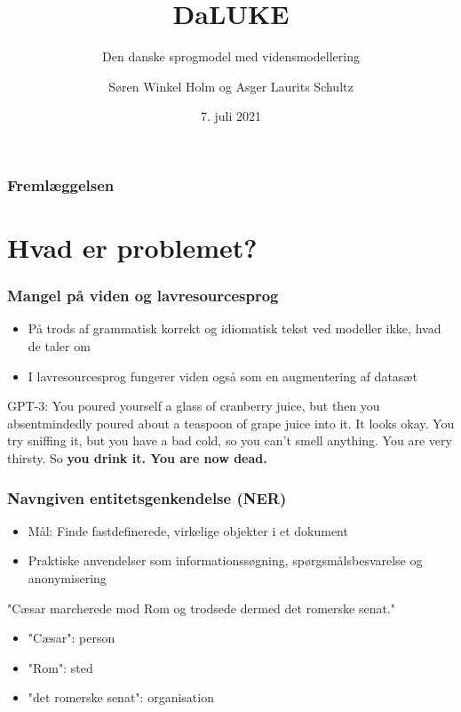 \documentclass{beamer}
\title{DaLUKE}
\subtitle{
    Den danske sprogmodel med vidensmodellering
}
\author[Søren Holm, Asger Schultz]{Søren Winkel Holm og Asger Laurits Schultz}
\institute[DTU]{Danmarks Tekniske Universitet}
\date{7. juli 2021}
\begin{document}
\begin{frame}
    \titlepage
\end{frame}



\begin{frame}
    \frametitle{Fremlæggelsen}
    \footnotesize
    \tableofcontents
\end{frame}

\section{Hvad er problemet?}
\begin{frame}
    \frametitle{Mangel på viden og lavresourcesprog}
    \begin{itemize}
        \item På trods af grammatisk korrekt og idiomatisk tekst ved modeller ikke, hvad de taler om\footnotemark
        \item I lavresourcesprog fungerer viden også som en augmentering af datasæt
    \end{itemize}
    \begin{example}
        \footnotesize
        GPT-3: You poured yourself a glass of cranberry juice, but then you absentmindedly poured about a teaspoon of grape juice into it. It looks okay. You try sniffing it, but you have a bad cold, so you can’t smell anything. You are very thirsty. So \textbf{you drink it. You are now dead.}
    \end{example}
\end{frame}

\begin{frame}
    \frametitle{Navngiven entitetsgenkendelse (NER)}
    \begin{itemize}
        \item Mål: Finde fastdefinerede, virkelige objekter i et dokument
        \item Praktiske anvendelser som informationssøgning, spørgsmålsbesvarelse og anonymisering
    \end{itemize}
    \begin{example}
        \footnotesize
        "Cæsar marcherede mod Rom og trodsede dermed det romerske senat."\\
        \begin{itemize}
            \item "Cæsar": person
            \item "Rom": sted
            \item "det romerske senat": organisation
        \end{itemize}
    \end{example}
\end{frame}
\end{document}
